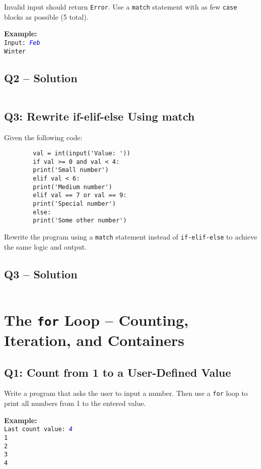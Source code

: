 \documentclass[a4paper,11pt]{article}
\begin{document}
	Invalid input should return \texttt{Error}. Use a \texttt{match} statement with as few \texttt{case} blocks as possible (5 total).
	
	\textbf{Example:}\\
	\texttt{Input: \textcolor{blue}{\textit{Feb}}}\\
	\texttt{Winter}
	
		\subsection*{Q2 – Solution}
	\inputminted{python}{Files/2/2.py}
	
	
	\subsection*{Q3: Rewrite if-elif-else Using match}
	Given the following code:
	
	\begin{verbatim}
		val = int(input('Value: '))
		if val >= 0 and val < 4:
		print('Small number')
		elif val < 6:
		print('Medium number')
		elif val == 7 or val == 9:
		print('Special number')
		else:
		print('Some other number')
	\end{verbatim}
	
	Rewrite the program using a \texttt{match} statement instead of \texttt{if-elif-else} to achieve the same logic and output.
	

	\subsection*{Q3 – Solution}
	\inputminted{python}{Files/2/3.py}
	
	
	\section{The \texttt{for} Loop – Counting, Iteration, and Containers}
	
	\subsection*{Q1: Count from 1 to a User-Defined Value}
	Write a program that asks the user to input a number. Then use a \texttt{for} loop to print all numbers from 1 to the entered value.
	
	\textbf{Example:}\\
	\texttt{Last count value: \textcolor{blue}{\textit{4}}}\\
	\texttt{1\\2\\3\\4}
	
\end{document}
